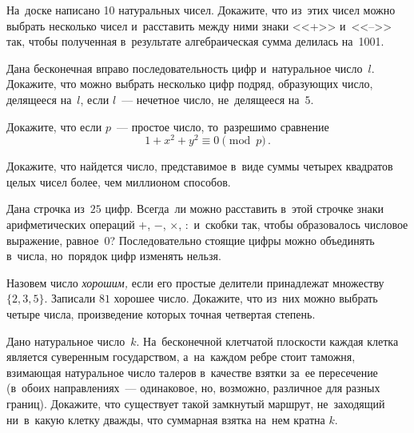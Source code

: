 


\begin{problems}

\item
На~доске написано 10 натуральных чисел.
Докажите, что из~этих чисел можно выбрать несколько чисел и~расставить между
ними знаки <<+>> и~<<-->> так, чтобы полученная в~результате алгебраическая
сумма делилась на~1001.

\item
Дана бесконечная вправо последовательность цифр и~натуральное число~$l$.
Докажите, что можно выбрать несколько цифр подряд, образующих число, делящееся
на~$l$, если $l$~--- нечетное число, не~делящееся на~$5$.


\item
Докажите, что если $p$~--- простое число, то~разрешимо сравнение
\[
    1 + x^2 + y^2 \equiv 0 \pmod{p}
\, . \]

\item
Докажите, что найдется число, представимое в~виде суммы четырех квадратов целых
чисел более, чем миллионом способов.

\item
Дана строчка из~$25$ цифр.
Всегда~ли можно расставить в~этой строчке знаки арифметических операций
$+$, $-$, $\times$, $:$ и~скобки так, чтобы образовалось числовое выражение,
равное~$0$?
Последовательно стоящие цифры можно объединять в~числа, но~порядок цифр
изменять нельзя.

\item
Назовем число \emph{хорошим,} если его простые делители принадлежат множеству
$\{ 2, 3, 5 \}$.
Записали $81$ хорошее число.
Докажите, что из~них можно выбрать четыре числа, произведение которых точная
четвертая степень.

\item
Дано натуральное число~$k$.
На~бесконечной клетчатой плоскости каждая клетка является суверенным
государством, а~на~каждом ребре стоит таможня, взимающая натуральное число
талеров в~качестве взятки за~ее пересечение (в~обоих направлениях~---
одинаковое, но, возможно, различное для разных границ).
Докажите, что существует такой замкнутый маршрут, не~заходящий ни~в~какую
клетку дважды, что суммарная взятка на~нем кратна $k$.

\end{problems}

